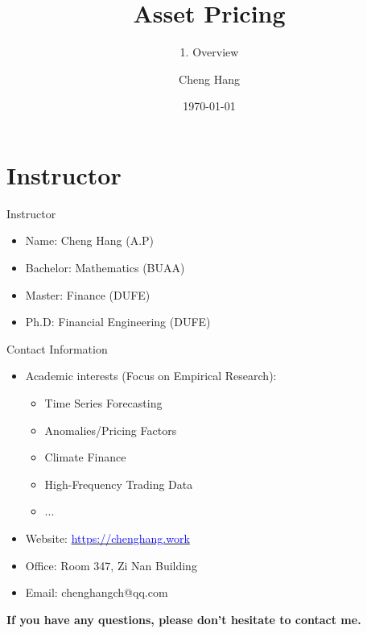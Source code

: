 \documentclass{beamer}
\title[Asset Pricing]{\textbf{Asset Pricing}} %
\subtitle{1. Overview}
\author[Cheng Hang]{Cheng Hang} %
\institute[DUFE] %
{School of Fintech \\
	Dongbei University of Finance \& Economics \\ %
	\medskip
	\textbf{chenghangch@qq.com}%
}
\date{\today} %
\begin{document}
	\begin{frame}
		\titlepage %
	\end{frame}





\section{Instructor}

\begin{frame}{Instructor}
	\begin{itemize}
		\item Name: Cheng Hang (A.P)
		\item Bachelor: Mathematics (BUAA)
		\item Master: Finance (DUFE)
		\item Ph.D: Financial Engineering (DUFE)
	\end{itemize}
\end{frame}

\begin{frame}{Contact Information}
	\begin{itemize}
		\item Academic interests (Focus on Empirical Research): 
		\begin{itemize}
		  \item Time Series Forecasting
            \item Anomalies/Pricing Factors
            \item Climate Finance
            \item High-Frequency Trading Data
            \item ...
		\end{itemize}
		\item Website: \href{https://chenghang.work}{\textcolor{blue}{https://chenghang.work}}
		\item Office: Room 347, Zi Nan Building
		\item Email: chenghangch@qq.com
	\end{itemize}
\textbf{If you have any questions, please don't hesitate to contact me.}
\end{frame}
\end{document}
